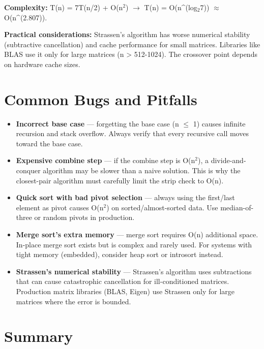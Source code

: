 \textbf{Complexity:} T(n) = 7T(n/2) + O(n$^{2}$) $\to$ T(n) = O(n\textasciicircum{}(log$_{2}$7)) $\approx $ O(n\textasciicircum{}(2.807)).

\textbf{Practical considerations:} Strassen's algorithm has worse numerical stability (subtractive cancellation) and cache performance for small matrices. Libraries like BLAS use it only for large matrices (n > 512-1024). The crossover point depends on hardware cache sizes.

\section{Common Bugs and Pitfalls}

\begin{itemize}
\item \textbf{Incorrect base case} — forgetting the base case (n $\le $ 1) causes infinite recursion and stack overflow. Always verify that every recursive call moves toward the base case.
\item \textbf{Expensive combine step} — if the combine step is O(n$^{2}$), a divide-and-conquer algorithm may be slower than a naive solution. This is why the closest-pair algorithm must carefully limit the strip check to O(n).
\item \textbf{Quick sort with bad pivot selection} — always using the first/last element as pivot causes O(n$^{2}$) on sorted/almost-sorted data. Use median-of-three or random pivots in production.
\item \textbf{Merge sort's extra memory} — merge sort requires O(n) additional space. In-place merge sort exists but is complex and rarely used. For systems with tight memory (embedded), consider heap sort or introsort instead.
\item \textbf{Strassen's numerical stability} — Strassen's algorithm uses subtractions that can cause catastrophic cancellation for ill-conditioned matrices. Production matrix libraries (BLAS, Eigen) use Strassen only for large matrices where the error is bounded.
\end{itemize}

\section{Summary}

